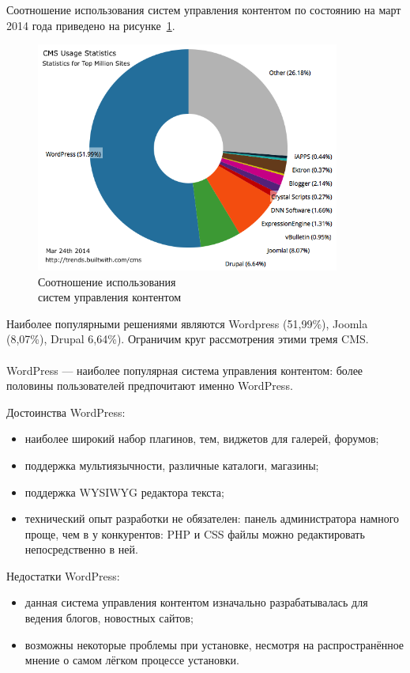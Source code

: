 Соотношение использования систем управления контентом по состоянию на март 2014 года приведено
на рисунке~\ref{fig:cms_usage_stat}.

\begin{figure}[h]
  \centering
  \includegraphics[width=100mm]{pic/cms_usage_statistics.png}
  \caption{Соотношение использования \\ систем управления контентом}
  \label{fig:cms_usage_stat}
\end{figure}

Наиболее популярными решениями являются Wordpress (51{,}99\%), Joomla (8{,}07\%), Drupal 6{,}64\%).
Ограничим круг рассмотрения этими тремя CMS.

\pagebreak
\paragraph{}
WordPress --- наиболее популярная система управления контентом:
более половины пользователей предпочитают именно WordPress.

Достоинства WordPress:
\begin{itemize}
\item
  наиболее широкий набор плагинов, тем, виджетов для галерей, форумов;
\item
  поддержка мультиязычности, различные каталоги, магазины;
\item
  поддержка WYSIWYG редактора текста;
\item
  технический опыт разработки не обязателен: панель администратора намного проще, чем в у конкурентов:
  PHP и CSS файлы можно редактировать непосредственно в ней.
\end{itemize}

Недостатки WordPress:
\begin{itemize}
\item
  данная система управления контентом изначально разрабатывалась для
  ведения блогов, новостных сайтов; 
\item
  возможны некоторые проблемы при установке,
  несмотря на распространённое мнение о самом лёгком процессе установки.
\end{itemize}

